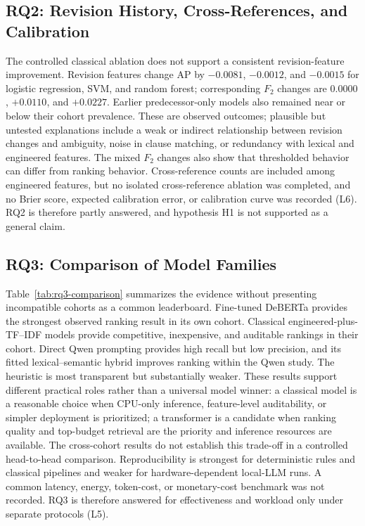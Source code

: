 \documentclass[12pt,a4paper,oneside]{report}
\begin{document}
\subsection{RQ2: Revision History, Cross-References, and Calibration}

The controlled classical ablation does not support a consistent revision-feature improvement. Revision features change AP by $-0.0081$, $-0.0012$, and $-0.0015$ for logistic regression, SVM, and random forest; corresponding $F_2$ changes are $0.0000$, $+0.0110$, and $+0.0227$. Earlier predecessor-only models also remained near or below their cohort prevalence. These are observed outcomes; plausible but untested explanations include a weak or indirect relationship between revision changes and ambiguity, noise in clause matching, or redundancy with lexical and engineered features. The mixed $F_2$ changes also show that thresholded behavior can differ from ranking behavior. Cross-reference counts are included among engineered features, but no isolated cross-reference ablation was completed, and no Brier score, expected calibration error, or calibration curve was recorded (L6). RQ2 is therefore partly answered, and hypothesis H1 is not supported as a general claim.

\subsection{RQ3: Comparison of Model Families}

Table~\ref{tab:rq3-comparison} summarizes the evidence without presenting incompatible cohorts as a common leaderboard. Fine-tuned DeBERTa provides the strongest observed ranking result in its own cohort. Classical engineered-plus-TF--IDF models provide competitive, inexpensive, and auditable rankings in their cohort. Direct Qwen prompting provides high recall but low precision, and its fitted lexical--semantic hybrid improves ranking within the Qwen study. The heuristic is most transparent but substantially weaker. These results support different practical roles rather than a universal model winner: a classical model is a reasonable choice when CPU-only inference, feature-level auditability, or simpler deployment is prioritized; a transformer is a candidate when ranking quality and top-budget retrieval are the priority and inference resources are available. The cross-cohort results do not establish this trade-off in a controlled head-to-head comparison. Reproducibility is strongest for deterministic rules and classical pipelines and weaker for hardware-dependent local-LLM runs. A common latency, energy, token-cost, or monetary-cost benchmark was not recorded. RQ3 is therefore answered for effectiveness and workload only under separate protocols (L5).
\end{document}
